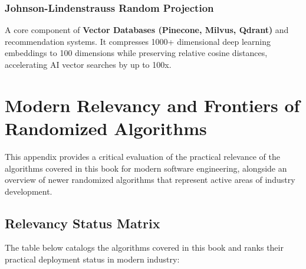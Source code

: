 \documentclass[twoside,12pt]{book}
\theoremstyle{plain}
\theoremstyle{definition}
\theoremstyle{remark}
\begin{document}
\subsection{Johnson-Lindenstrauss Random Projection}
A core component of \textbf{Vector Databases (Pinecone, Milvus, Qdrant)} and recommendation 
systems. It compresses 1000+ dimensional deep learning embeddings to 100 dimensions 
while preserving relative cosine distances, accelerating AI vector searches by up to 100x.

\chapter{Modern Relevancy and Frontiers of Randomized Algorithms}
\label{app:relevancy}

This appendix provides a critical evaluation of the practical relevance of the 
algorithms covered in this book for modern software engineering, alongside an overview 
of newer randomized algorithms that represent active areas of industry development.

\section{Relevancy Status Matrix}

The table below catalogs the algorithms covered in this book and ranks their 
practical deployment status in modern industry:
\end{document}

